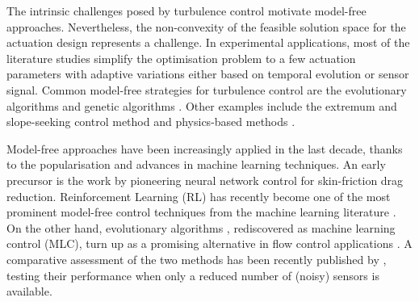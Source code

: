 The intrinsic challenges posed by turbulence control motivate model-free approaches. Nevertheless, the non-convexity of the feasible solution space for the actuation design represents a challenge. In experimental applications, most of the literature studies simplify the optimisation problem to a few actuation parameters with adaptive variations either based on temporal evolution or sensor signal. Common model-free strategies for turbulence control are the evolutionary algorithms \citep{Koumoutsakos2001evolcontrol} and genetic algorithms \citep{Benard2016ga}. Other examples include the extremum and slope-seeking control method \citep{Krstic2000extremumseek, Becker2007extseek, Gelbert2012extseek} and physics-based methods \citep{pastoor2008control,Zhang2004control}. 

Model-free approaches have been increasingly applied in the last decade, thanks to the popularisation and advances in machine learning techniques. An early precursor is the work by \citet{Lee1997NN} pioneering neural network control for skin-friction drag reduction. Reinforcement Learning (RL) has recently become one of the most prominent model-free control techniques from the machine learning literature \citep{rabault2019JFM,Beintema2020,li2021ReLe,paris2021}. On the other hand, evolutionary algorithms \citep{Dracopoulos1997geneticalg}, rediscovered as machine learning control (MLC), turn up as a promising alternative in flow control applications \citep{duriez2017book,li2017GP}. A comparative assessment of the two methods has been recently published by \citet{Castellanos2022LGPCvsRL}, testing their performance when only a reduced number of (noisy) sensors is available. 

